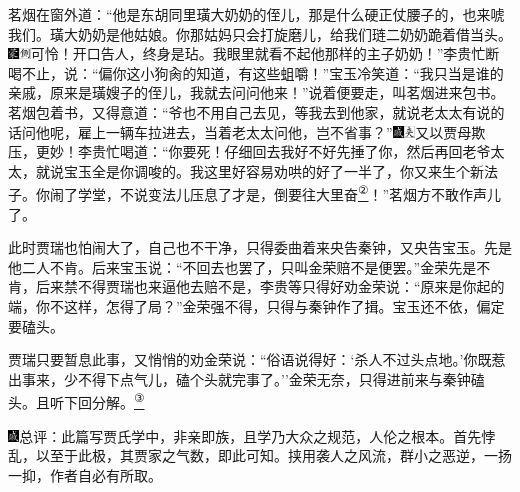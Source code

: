 茗烟在窗外道：``他是东胡同里璜大奶奶的侄儿，那是什么硬正仗腰子的，也来唬我们。璜大奶奶是他姑娘。你那姑妈只会打旋磨儿，给我们琏二奶奶跪着借当头。{\includegraphics[width=3mm]{../Images/00006}\includegraphics[width=3mm]{../Images/00011}\footnotesize \kaishu 可怜！开口告人，终身是玷。}我眼里就看不起他那样的主子奶奶！''李贵忙断喝不止，说：``偏你这小狗肏的知道，有这些蛆嚼！''宝玉冷笑道：``我只当是谁的亲戚，原来是璜嫂子的侄儿，我就去问问他来！''说着便要走，叫茗烟进来包书。茗烟包着书，又得意道：``爷也不用自己去见，等我去到他家，就说老太太有说的话问他呢，雇上一辆车拉进去，当着老太太问他，岂不省事？''{\includegraphics[width=3mm]{../Images/00005}\includegraphics[width=3mm]{../Images/00012}\footnotesize \kaishu 又以贾母欺压，更妙！}李贵忙喝道：``你要死！仔细回去我好不好先捶了你，然后再回老爷太太，就说宝玉全是你调唆的。我这里好容易劝哄的好了一半了，你又来生个新法子。你闹了学堂，不说变法儿压息了才是，倒要往大里奋\href{../Text/part0013_split_000.html\#lnkback_2_a}{\textsuperscript{②}}！''茗烟方不敢作声儿了。

此时贾瑞也怕闹大了，自己也不干净，只得委曲着来央告秦钟，又央告宝玉。先是他二人不肯。后来宝玉说：``不回去也罢了，只叫金荣赔不是便罢。''金荣先是不肯，后来禁不得贾瑞也来逼他去赔不是，李贵等只得好劝金荣说：``原来是你起的端，你不这样，怎得了局？''金荣强不得，只得与秦钟作了揖。宝玉还不依，偏定要磕头。

贾瑞只要暂息此事，又悄悄的劝金荣说：``俗语说得好：`杀人不过头点地。'你既惹出事来，少不得下点气儿，磕个头就完事了。''金荣无奈，只得进前来与秦钟磕头。且听下回分解。\href{../Text/part0013_split_000.html\#lnkback_3_a}{\textsuperscript{③}}

{\includegraphics[width=3mm]{../Images/00005}\kaishu 总评：此篇写贾氏学中，非亲即族，且学乃大众之规范，人伦之根本。首先悖乱，以至于此极，其贾家之气数，即此可知。挟用袭人之风流，群小之恶逆，一扬一抑，作者自必有所取。}

